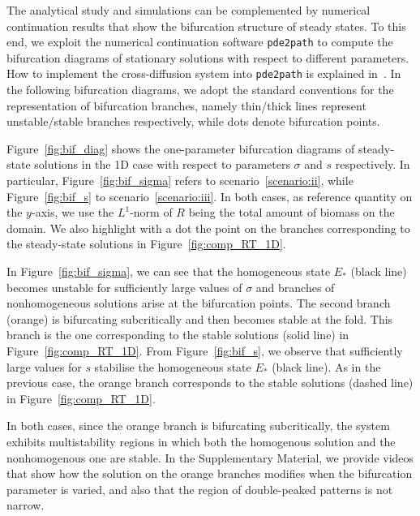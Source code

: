 \documentclass[11pt]{elsarticle}
\theoremstyle{plain}
\theoremstyle{definition}
\theoremstyle{myremark}
\begin{document}
The analytical study and simulations can be complemented by numerical continuation results that show the bifurcation structure of steady states. To this end, we exploit the numerical continuation software \texttt{pde2path} to compute the bifurcation diagrams of stationary solutions with respect to different parameters. How to implement the cross-diffusion system into \texttt{pde2path} is explained in~\cite{CKCS}. In the following bifurcation diagrams, we adopt the standard conventions for the representation of bifurcation branches, namely thin/thick lines represent unstable/stable branches respectively, while dots denote bifurcation points.

Figure~\ref{fig:bif_diag} shows the one-parameter bifurcation diagrams of steady-state solutions in the 1D case with respect to parameters $\sigma$ and $s$ respectively. In particular, Figure~\ref{fig:bif_sigma} refers to scenario~\eqref{scenario:ii}, while Figure~\ref{fig:bif_s} to scenario~\eqref{scenario:iii}. In both cases, as reference quantity on the $y$-axis, we use the $L^1$-norm of $R$ being the total amount of biomass on the domain. We also highlight with a dot the point on the branches corresponding to the steady-state solutions in Figure~\ref{fig:comp_RT_1D}.

In Figure~\ref{fig:bif_sigma}, we can see that the homogeneous state $E_*$ (black line) becomes unstable for sufficiently large values of $\sigma$ and branches of nonhomogeneous solutions arise at the bifurcation points. The second branch (orange) is bifurcating subcritically and then becomes stable at the fold. This branch is the one corresponding to the stable solutions (solid line) in Figure~\ref{fig:comp_RT_1D}. From Figure~\ref{fig:bif_s}, we observe that sufficiently large values for $s$ stabilise the homogeneous state $E_*$ (black line). As in the previous case, the orange branch corresponds to the stable solutions (dashed line) in Figure~\ref{fig:comp_RT_1D}. 

In both cases, since the orange branch is bifurcating subcritically, the system exhibits multistability regions in which both the homogenous solution and the nonhomogenous one are stable. In the Supplementary Material, we provide videos that show how the solution on the orange branches modifies when the bifurcation parameter is varied, and also that the region of double-peaked patterns is not narrow.
\end{document}
